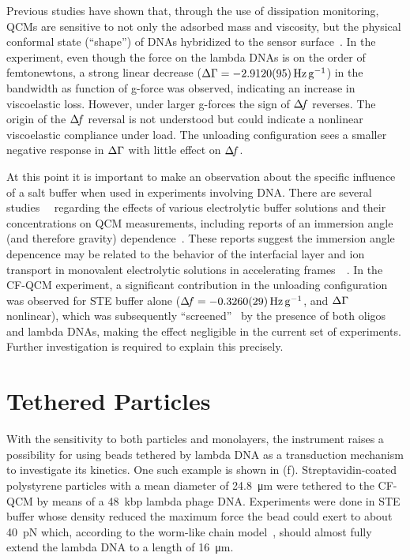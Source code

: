 Previous studies have shown that, through the use of dissipation
monitoring, QCMs are sensitive to not only the adsorbed mass and viscosity,
but the physical conformal state (``shape'') of DNAs hybridized to the
sensor surface~\cite{tsortos2008shear}.  In the experiment, even though the
force on the lambda DNAs is on the order of femtonewtons, a strong linear
decrease ($\dg=\SI{-2.912+-0.0095}{\hertz\per\g}$) in the bandwidth as
function of g-force was observed, indicating an increase in viscoelastic
loss.  However, under larger g-forces the sign of $\Delta\!f$ reverses.  The
origin of the $\Delta\!f$ reversal is not understood but could indicate a
nonlinear viscoelastic compliance under load.  The unloading configuration
sees a smaller negative response in $\Delta\Gamma$ with little effect on $\Delta\!f$.

At this point it is important to make an observation about the specific
influence of a salt buffer when used in experiments involving DNA\@.  There
are several studies~\cite{encarnaccao2007influence}~\cite{lin1995role}
regarding the effects of various electrolytic buffer solutions and their
concentrations on QCM measurements, including reports of an immersion angle
(and therefore gravity) dependence~\cite{yoshimoto2006characteristics}.  These
reports suggest the immersion angle depencence may be related to the behavior
of the interfacial layer and ion transport in monovalent electrolytic
solutions in accelerating
frames~\cite{tolman1911electromotive}~\cite{des1893unpolarisirbare}.  In the
CF-QCM experiment, a significant contribution in the unloading configuration
was observed for STE buffer alone ($\df=\SI{-0.326+-0.0029}{\hertz\per\g}$,
and $\Delta\Gamma$ nonlinear), which was subsequently
``screened''~\cite{zhang2002insulating} by the presence of both oligos and
lambda DNAs, making the effect negligible in the current set of experiments.
Further investigation is required to explain this precisely.

\section{Tethered Particles}
With the sensitivity to both particles and monolayers, the instrument
raises a possibility for using beads tethered by lambda DNA as a
transduction mechanism to investigate its kinetics.  One such example is
shown in (f).  Streptavidin-coated polystyrene
particles with a mean diameter of \SI{24.8}{\micro\meter} were tethered to
the CF-QCM by means of a \SI{48}{kbp} lambda phage DNA\@.  Experiments were
done in STE buffer whose density reduced the maximum force the bead could
exert to about \SI{40}{\pico\newton} which, according to the worm-like
chain model~\cite{marko1995stretching}, should almost fully extend the
lambda DNA to a length of \SI{16}{\micro\meter}.

